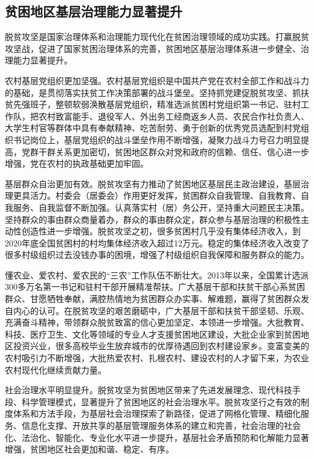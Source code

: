 \documentclass{ctexart}
\begin{document}
\subsection{贫困地区基层治理能力显著提升}

脱贫攻坚是国家治理体系和治理能力现代化在贫困治理领域的成功实践。打赢脱贫攻坚战，促进了国家贫困治理体系的完善，贫困地区基层治理体系进一步健全、治理能力显著提升。

农村基层党组织更加坚强。农村基层党组织是中国共产党在农村全部工作和战斗力的基础，是贯彻落实扶贫工作决策部署的战斗堡垒。坚持抓党建促脱贫攻坚、抓扶贫先强班子，整顿软弱涣散基层党组织，精准选派贫困村党组织第一书记、驻村工作队，把农村致富能手、退役军人、外出务工经商返乡人员、农民合作社负责人、大学生村官等群体中具有奉献精神、吃苦耐劳、勇于创新的优秀党员选配到村党组织书记岗位上，基层党组织的战斗堡垒作用不断增强，凝聚力战斗力号召力明显提高，党群干群关系更加密切，贫困地区群众对党和政府的信赖、信任、信心进一步增强，党在农村的执政基础更加牢固。

基层群众自治更加有效。脱贫攻坚有力推动了贫困地区基层民主政治建设，基层治理更具活力。村委会（居委会）作用更好发挥，贫困群众自我管理、自我教育、自我服务、自我监督不断加强。认真落实村（居）务公开，坚持重大问题民主决策。坚持群众的事由群众商量着办，群众的事由群众定，群众参与基层治理的积极性主动性创造性进一步增强。脱贫攻坚之初，很多贫困村几乎没有集体经济收入，到2020年底全国贫困村的村均集体经济收入超过12万元。稳定的集体经济收入改变了很多村级组织过去没钱办事的困境，增强了村级组织自我保障和服务群众的能力。

懂农业、爱农村、爱农民的“三农”工作队伍不断壮大。2013年以来，全国累计选派300多万名第一书记和驻村干部开展精准帮扶。广大基层干部和扶贫干部心系贫困群众、甘愿牺牲奉献，满腔热情地为贫困群众办实事、解难题，赢得了贫困群众发自内心的认可。在脱贫攻坚的艰苦磨砺中，广大基层干部和扶贫干部坚韧、乐观、充满奋斗精神，带领群众脱贫致富的信心更加坚定、本领进一步增强。大批教育、科技、医疗卫生、文化等领域的专业人才支援贫困地区建设，大批企业家到贫困地区投资兴业，很多高校毕业生放弃城市的优厚待遇回到农村建设家乡。变富变美的农村吸引力不断增强，大批热爱农村、扎根农村、建设农村的人才留下来，为农业农村现代化继续贡献力量。

社会治理水平明显提升。脱贫攻坚为贫困地区带来了先进发展理念、现代科技手段、科学管理模式，显著提升了贫困地区的社会治理水平。脱贫攻坚行之有效的制度体系和方法手段，为基层社会治理探索了新路径，促进了网格化管理、精细化服务、信息化支撑、开放共享的基层管理服务体系的建立和完善，社会治理的社会化、法治化、智能化、专业化水平进一步提升，基层社会矛盾预防和化解能力显著增强，贫困地区社会更加和谐、稳定、有序。
\end{document}
